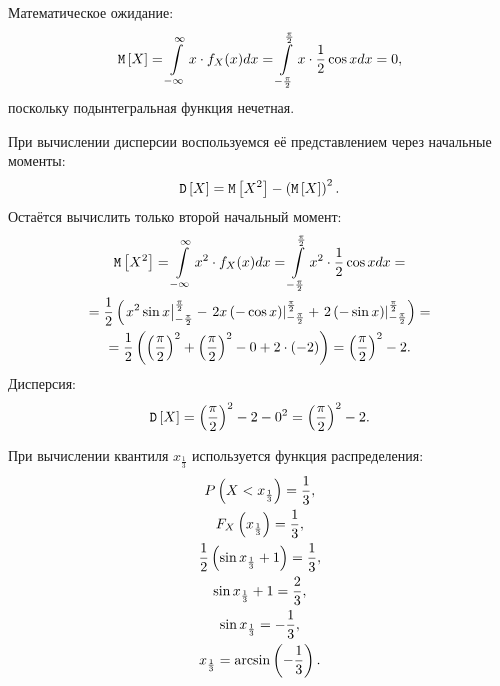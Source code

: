 Математическое ожидание:
\begin{equation}
    \mathtt{M} \left [ X \right ]
    = \int \limits_{-\infty}^{\infty} x \cdot f_X(x) dx
    = \int \limits_{-\frac{\pi}{2}}^{\frac{\pi}{2}} x \cdot \frac{1}{2} \cos x dx
    = 0,
\end{equation}
поскольку подынтегральная функция нечетная.

При вычислении дисперсии воспользуемся её представлением через начальные моменты:
\begin{equation}
    \mathtt{D} \left [ X \right ] = \mathtt{M} \left [ X^2 \right ] - \left ( \mathtt{M} \left [ X \right ] \right )^2 .
\end{equation}
Остаётся вычислить только второй начальный момент:
\begin{multline}
    \mathtt{M} \left [ X^2 \right ]
    = \int \limits_{-\infty}^{\infty} x^2 \cdot f_X(x) dx
    = \int \limits_{-\frac{\pi}{2}}^{\frac{\pi}{2}} x^2 \cdot \frac{1}{2} \cos x dx = \\
    = \frac{1}{2} \left (
    \left . x^2 \sin x \right |_{-\frac{\pi}{2}}^{\frac{\pi}{2}}
    - \left . 2 x \left ( - \cos x \right )\right |_{-\frac{\pi}{2}}^{\frac{\pi}{2}}
    + \left . 2 \left ( - \sin x \right )\right |_{-\frac{\pi}{2}}^{\frac{\pi}{2}}
    \right )
    = \\
    = \frac{1}{2} \left (
    \left ( \frac{\pi}{2} \right )^2 +  \left ( \frac{\pi}{2} \right )^2
    - 0
    + 2 \cdot ( - 2 )
    \right )
    = \left ( \frac{\pi}{2} \right )^2 - 2.
\end{multline}
Дисперсия:
\begin{equation}
    \mathtt{D} \left [ X \right ]
    = \left ( \frac{\pi}{2} \right )^2 - 2 - 0^2
    = \left ( \frac{\pi}{2} \right )^2 - 2.
\end{equation}

При вычислении квантиля $x_{\frac{1}{3}}$ используется функция распределения:
\begin{gather}
    P \left ( X < x_{\frac{1}{3}} \right ) = \frac{1}{3} , \\
    F_X \left ( x_{\frac{1}{3}} \right ) = \frac{1}{3} , \\
    \frac{1}{2} \left ( \sin x_{\frac{1}{3}} + 1 \right ) = \frac{1}{3} , \\
    \sin x_{\frac{1}{3}} + 1 = \frac{2}{3} , \\
    \sin x_{\frac{1}{3}} = - \frac{1}{3} , \\
    x_{\frac{1}{3}} = \arcsin \left (- \frac{1}{3} \right ) .
\end{gather}

